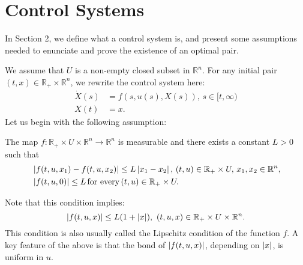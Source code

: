 \section{Control Systems}\label{Section:ContSys}
    In Section 2, we define what a control system is, and present some assumptions needed 
    to enunciate and prove the existence of an optimal pair.

    We assume that $U$ is a non-empty closed subset in $\mathbb{R}^n$. For any initial pair 
    $(t,x)\in \mathbb{R}_{+}\times\mathbb{R}^n$, we rewrite the control system here:
    \begin{equation}\label{ControlSystem}
        \begin{aligned}
            \dot{X}(s) &=f(s,u(s),X(s)),\, s\in [t,\infty) \\
            X(t)    &=x.
        \end{aligned}
    \end{equation}
    Let us begin with the following assumption:
    \begin{asparaenum}[(\textbf{C}-1)]\label{Cond:C1}
        \item 
            The map $f:\mathbb{R}_{+}\times U\times \mathbb{R}^n\to \mathbb{R}^n$ 
            is measurable and there exists a constant $L>0$ such that
        \begin{equation}
            \begin{aligned}
                &\abs{f(t,u,x_1)-f(t,u,x_2)} \leq L\abs{x_1-x_2},\, (t,u) \in %
                    \mathbb{R}_{+}\times U,\, x_1,x_2\in \mathbb{R}^n, \\
                &\abs{f(t,u,0)} \leq L \,\mbox{for every}\,(t,u) \in %
                    \mathbb{R}_{+}\times U.
            \end{aligned}
        \end{equation}
    \end{asparaenum}
    Note that this condition implies:
    $$
        \abs{f(t,u,x)} \leq L(1+\abs{x}), \, \, (t,u,x) \in %
        \mathbb{R}_{+}\times U \times \mathbb{R}^n.
    $$
    This condition is also usually called the Lipschitz condition of the function
    $f$. A key feature of the above is that the bond of $\left\lvert f(t,u,x)\right\rvert$, depending 
    on $\left\lvert x\right\rvert$, is uniform in $u$.
